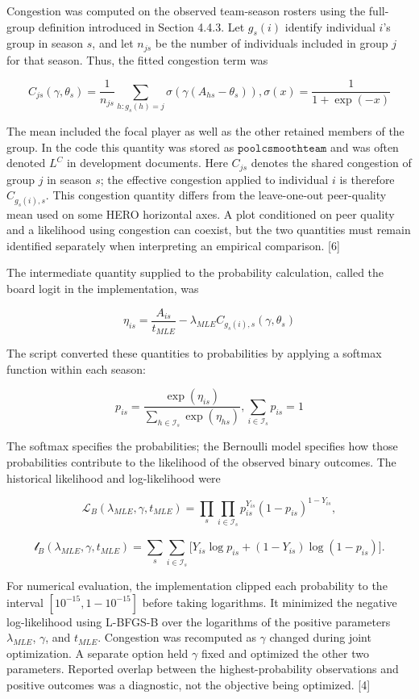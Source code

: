 Congestion was computed on the observed team-season rosters using the full-group definition introduced in Section 4.4.3. Let \(g_s(i)\) identify individual \(i\)'s group in season \(s\), and let \(n_{js}\) be the number of individuals included in group \(j\) for that season. Thus, the fitted congestion term was

\[
C_{js}\left( \gamma,\theta_{s} \right) = \frac{1}{n_{js}}\sum_{h:g_{s}(h) = j}^{}\sigma\left( \gamma\left( A_{hs} - \theta_{s} \right) \right),\sigma(x) = \frac{1}{1 + \exp( - x)}
\]

The mean included the focal player as well as the other retained members of the group. In the code this quantity was stored as \(\mathtt{pool c smooth team}\) and was often denoted \(L^{C}\) in development documents. Here \(C_{js}\) denotes the shared congestion of group \(j\) in season \(s\); the effective congestion applied to individual \(i\) is therefore \(C_{g_s(i),s}\). This congestion quantity differs from the leave-one-out peer-quality mean used on some HERO horizontal axes. A plot conditioned on peer quality and a likelihood using congestion can coexist, but the two quantities must remain identified separately when interpreting an empirical comparison. {[}6{]}

The intermediate quantity supplied to the probability calculation, called the board logit in the implementation, was

\[
\eta_{is} = \frac{A_{is}}{t_{MLE}} - \lambda_{MLE}C_{g_{s}(i),s}\left( \gamma,\theta_{s} \right)
\]

The script converted these quantities to probabilities by applying a softmax function within each season:

\[
p_{is} = \frac{\exp\left( \eta_{is} \right)}{\sum_{h \in \mathcal{I}_{s}}^{}{\exp\left( \eta_{hs} \right)}},\sum_{i \in \mathcal{I}_{s}}^{}p_{is} = 1
\]

The softmax specifies the probabilities; the Bernoulli model specifies how those probabilities contribute to the likelihood of the observed binary outcomes. The historical likelihood and log-likelihood were

\[
\mathcal{L}_{B}(\lambda_{MLE},\gamma,t_{MLE}) = \prod_{s}^{}{\prod_{i \in \mathcal{I}_{s}}^{}p_{is}^{Y_{is}}}(1 - p_{is})^{1 - Y_{is}},
\]

\[
\mathcal{l}_{B}(\lambda_{MLE},\gamma,t_{MLE}) = \sum_{s}^{}{\sum_{i \in \mathcal{I}_{s}}^{}\lbrack}Y_{is}\log p_{is} + (1 - Y_{is})\log(1 - p_{is})\rbrack.
\]

For numerical evaluation, the implementation clipped each probability to the interval \(\left\lbrack 10^{- 15},1 - 10^{- 15} \right\rbrack\) before taking logarithms. It minimized the negative log-likelihood using L-BFGS-B over the logarithms of the positive parameters \(\lambda_{MLE}\), \(\gamma\), and \(t_{MLE}\). Congestion was recomputed as \(\gamma\) changed during joint optimization. A separate option held \(\gamma\) fixed and optimized the other two parameters. Reported overlap between the highest-probability observations and positive outcomes was a diagnostic, not the objective being optimized. {[}4{]}

